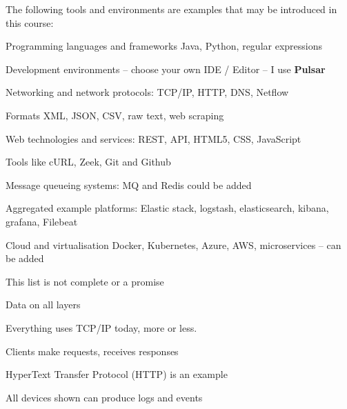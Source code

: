 \documentclass[Screen16to9,17pt]{foils}
\begin{document}

The following tools and environments are examples that may be introduced in this course:

\begin{list2}
\item Programming languages and frameworks Java, Python, regular expressions
\item Development environments -- choose your own IDE / Editor -- I use {\bf Pulsar}
\item Networking and network protocols: TCP/IP, HTTP, DNS, Netflow
\item Formats XML, JSON, CSV, raw text, web scraping
\item Web technologies and services: REST, API, HTML5, CSS, JavaScript
\item Tools like cURL, Zeek, Git and Github
\item Message queueing systems: MQ and Redis could be added
\item Aggregated example platforms: Elastic stack, logstash, elasticsearch, kibana, grafana, Filebeat
\item Cloud and virtualisation Docker, Kubernetes, Azure, AWS, microservices -- can be added
\end{list2}

\centerline{This list is not complete or a promise }




\centerline{Data on all layers}



\begin{list2}
\item Everything uses TCP/IP today, more or less.
\item Clients make requests, receives responses
\item HyperText Transfer Protocol (HTTP) is an example
\item All devices shown can produce logs and events
\end{list2}




\begin{quote}

\end{quote}
\end{document}
